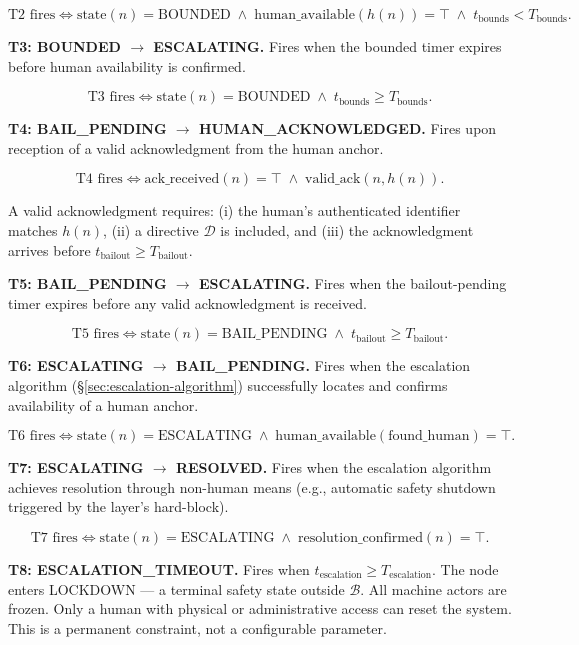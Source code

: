 \[
\text{T2 fires} \iff \text{state}(n) = \text{BOUNDED}
\;\land\;
\text{human\_available}(h(n)) = \top
\;\land\;
t_{\text{bounds}} < T_{\text{bounds}}. \tag{T2}
\]

\bigskip
\noindent\textbf{T3: BOUNDED $\rightarrow$ ESCALATING.} Fires when the bounded timer expires before human availability is confirmed.

\[
\text{T3 fires} \iff \text{state}(n) = \text{BOUNDED}
\;\land\;
t_{\text{bounds}} \geq T_{\text{bounds}}. \tag{T3}
\]

\bigskip
\noindent\textbf{T4: BAIL\_PENDING $\rightarrow$ HUMAN\_ACKNOWLEDGED.} Fires upon reception of a valid acknowledgment from the human anchor.

\[
\text{T4 fires} \iff \text{ack\_received}(n) = \top
\;\land\;
\text{valid\_ack}(n, h(n)). \tag{T4}
\]

A valid acknowledgment requires: (i) the human's authenticated identifier matches $h(n)$, (ii) a directive $\mathcal{D}$ is included, and (iii) the acknowledgment arrives before $t_{\text{bailout}} \geq T_{\text{bailout}}$.

\bigskip
\noindent\textbf{T5: BAIL\_PENDING $\rightarrow$ ESCALATING.} Fires when the bailout-pending timer expires before any valid acknowledgment is received.

\[
\text{T5 fires} \iff \text{state}(n) = \text{BAIL\_PENDING}
\;\land\;
t_{\text{bailout}} \geq T_{\text{bailout}}. \tag{T5}
\]

\bigskip
\noindent\textbf{T6: ESCALATING $\rightarrow$ BAIL\_PENDING.} Fires when the escalation algorithm (\S\ref{sec:escalation-algorithm}) successfully locates and confirms availability of a human anchor.

\[
\text{T6 fires} \iff \text{state}(n) = \text{ESCALATING}
\;\land\;
\text{human\_available}(\text{found\_human}) = \top. \tag{T6}
\]

\bigskip
\noindent\textbf{T7: ESCALATING $\rightarrow$ RESOLVED.} Fires when the escalation algorithm achieves resolution through non-human means (e.g., automatic safety shutdown triggered by the \fact{} layer's hard-block).

\[
\text{T7 fires} \iff \text{state}(n) = \text{ESCALATING}
\;\land\;
\text{resolution\_confirmed}(n) = \top. \tag{T7}
\]

\bigskip
\noindent\textbf{T8: ESCALATION\_TIMEOUT.} Fires when $t_{\text{escalation}} \geq T_{\text{escalation}}$. The node enters LOCKDOWN — a terminal safety state outside $\mathcal{B}$. All machine actors are frozen. Only a human with physical or administrative access can reset the system. This is a permanent constraint, not a configurable parameter.

